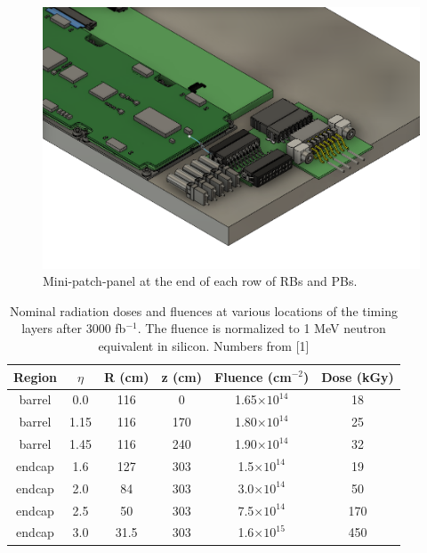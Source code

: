 \documentclass[11pt]{article}
\begin{document}
\begin{figure}[!ht]
\centering
\includegraphics[width=0.70 \textwidth]{figures/patch_panel_3D.png}
\caption{
Mini-patch-panel at the end of each row of RBs and PBs.
}
\label{fig:patchpanel}
\end{figure}


\begin{table}
  \centering
  \caption{Nominal radiation doses and fluences at various locations of the timing layers after 3000 fb$^{-1}$. The fluence is normalized to 1 MeV neutron equivalent in silicon.
  Numbers from [1]}
  \begin{tabular}{ c c c c c c }
    Region & $\eta$ & R (cm) & z (cm) & Fluence (cm$^{-2}$) & Dose (kGy) \\
    \midrule
    barrel & 0.0    & 116    & 0      & 1.65$\times 10^{14}$ & 18         \\
    barrel & 1.15   & 116    & 170    & 1.80$\times 10^{14}$ & 25         \\
    barrel & 1.45   & 116    & 240    & 1.90$\times 10^{14}$ & 32         \\
    endcap & 1.6    & 127    & 303    & 1.5$\times 10^{14}$ & 19         \\
    endcap & 2.0    & 84     & 303    & 3.0$\times 10^{14}$ & 50         \\
    endcap & 2.5    & 50     & 303    & 7.5$\times 10^{14}$ & 170        \\
    endcap & 3.0    & 31.5   & 303    & 1.6$\times 10^{15}$ & 450        \\
  \end{tabular}
  \label{tab:radiation-doses}
\end{table}
\end{document}
